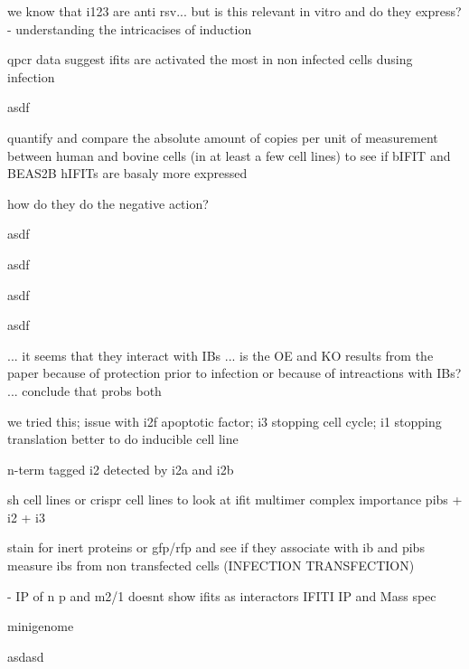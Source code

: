 we know that i123 are anti rsv...
but is this relevant in vitro and do they express?
- understanding the intricacises of induction

qpcr data suggest ifits are activated the most in non infected cells dusing infection

asdf

quantify and compare the absolute amount of copies per unit of measurement between human and bovine cells (in at least a few cell lines) to see if bIFIT and BEAS2B hIFITs are basaly more expressed

how do they do the negative action?

asdf

asdf

asdf

asdf


... it seems that they interact with IBs ... is the OE and KO results from the paper because of protection prior to infection or because of intreactions with IBs? ... conclude that probs both



we tried this; issue with i2f apoptotic factor; i3 stopping cell cycle; i1 stopping translation
better to do inducible cell line

n-term tagged i2 detected by i2a and i2b

sh cell lines or crispr cell lines to look at ifit multimer complex importance
pibs + i2 + i3

stain for inert proteins or gfp/rfp and see if they associate with ib and pibs
measure ibs from non transfected cells (INFECTION TRANSFECTION)

\cite{Oliveira2013HumanCells} - IP of n p and m2/1 doesnt show ifits as interactors
IFITI IP and Mass spec

minigenome

asdasd

